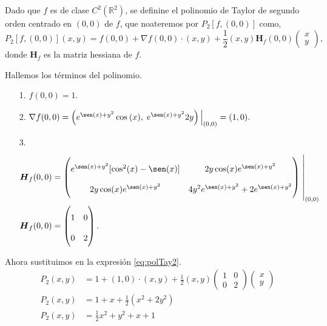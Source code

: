 \begin{solution}
    Dado que $f$ es de clase  $C^2(\mathbb{R}^2)$,  se definine  el polinomio de Taylor de segundo orden centrado en $(0,0)$ de $f$, que noateremos por $P_2[f,(0,0)]$ como,
    \begin{equation}
        P_2[f,(0,0)](x,y)=f(0,0)+\nabla f(0,0)\cdot(x,y)+\frac{1}{2}(x,y)\boldsymbol{H}_f(0,0)\begin{pmatrix}x\\y\end{pmatrix}, \label{eq:polTay2}
    \end{equation}
    donde $\boldsymbol{H}_f$ es la matriz hessiana de $f$.

    Hallemos los  términos del polinomio.

    \begin{itemize}
        \item[1.] $f(0,0)=1.$
        \item[2.] $ \nabla f(0,0) = \left(e^{\sen(x)+y^2}\cos\:(x),\;e^{\sen(x)+y^2}2y\right)\Big\rvert_{(0,0)}=(1,0).$
        \item[3.] \begin{align*}
                  \boldsymbol{H}_f(0,0) & =\left(
                  \renewcommand{\arraystretch}{2} %
                  \begin{matrix}
                      e^{\sen(x)+y^2}[\cos^2(x)-\sen(x)] & 2y\cos(x)e^{\sen(x)+y^2}             \\
                      2y\cos(x)e^{\sen(x)+y^2}           & 4y^2e^{\sen(x)+y^2}+2e^{\sen(x)+y^2}
                  \end{matrix}\right)\left.\rule{0pt}{1.1cm}\right\rvert_{(0,0)} \\
                  \boldsymbol{H}_f(0,0) & =\left(\begin{matrix}
                                                         1 & 0 \\0&2
                                                     \end{matrix}\right).
              \end{align*}
    \end{itemize}

    Ahora sustituimos en la expresión \eqref{eq:polTay2}.
    \begin{align*}
        P_2(x,y) & =1+(1,0)\cdot(x,y)+\frac{1}{2}(x,y)\left(\begin{matrix}1&0\\0&2\end{matrix}\right)\begin{pmatrix}x\\y\end{pmatrix} \\
        P_2(x,y) & =1+x+\frac{1}{2}(x^2+2y^2)                                                                                         \\
        P_2(x,y) & =\frac{1}{2}x^2+y^2+x+1
    \end{align*}


\end{solution}
